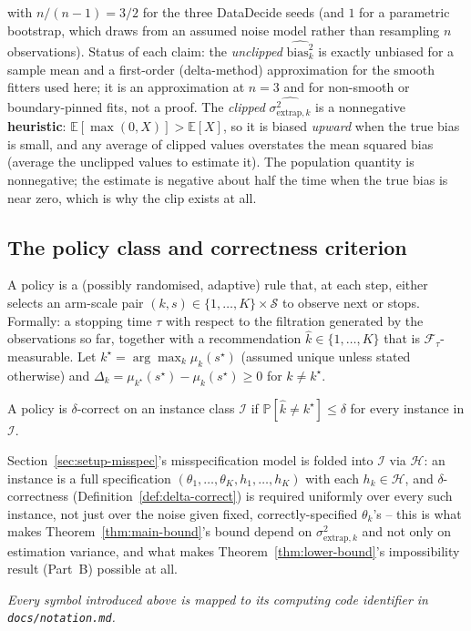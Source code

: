 \begin{remark}
\[\]
with $n/(n-1) = 3/2$ for the three DataDecide seeds (and $1$ for a parametric bootstrap,
which draws from an assumed noise model rather than resampling $n$ observations).
Status of each claim: the \emph{unclipped} $\widehat{\mathrm{bias}^2_k}$ is exactly
unbiased for a sample mean and a first-order (delta-method) approximation for the smooth
fitters used here; it is an approximation at $n = 3$ and for non-smooth or
boundary-pinned fits, not a proof. The \emph{clipped} $\widehat{\sigma^2_{\mathrm{extrap}, k}}$
is a nonnegative \textbf{heuristic}: $\mathbb{E}[\max(0, X)] > \mathbb{E}[X]$, so it is
biased \emph{upward} when the true bias is small, and any average of clipped values
overstates the mean squared bias (average the unclipped values to estimate it). The
population quantity is nonnegative; the estimate is negative about half the time when the
true bias is near zero, which is why the clip exists at all.
\end{remark}

\subsection{The policy class and correctness criterion}
\label{sec:setup-policy}

A policy is a (possibly randomised, adaptive) rule that, at each step, either selects
an arm-scale pair $(k, s) \in \{1, \dots, K\} \times \mathcal{S}$ to observe next or
stops. Formally: a stopping time $\tau$ with respect to the filtration generated by the
observations so far, together with a recommendation $\hat{k} \in \{1, \dots, K\}$ that
is $\mathcal{F}_\tau$-measurable. Let
$k^\star = \arg\max_k \mu_k(s^\star)$ (assumed unique unless stated otherwise) and
$\Delta_k = \mu_{k^\star}(s^\star) - \mu_k(s^\star) \ge 0$ for $k \ne k^\star$.

\begin{definition}
\label{def:delta-correct}
A policy is $\delta$-correct on an instance class $\mathcal{I}$ if
$\mathbb{P}[\hat{k} \ne k^\star] \le \delta$ for every instance in $\mathcal{I}$.
\end{definition}

Section~\ref{sec:setup-misspec}'s misspecification model is folded into
$\mathcal{I}$ via $\mathcal{H}$: an instance is a full specification
$(\theta_1, \dots, \theta_K, h_1, \dots, h_K)$ with each $h_k \in \mathcal{H}$, and
$\delta$-correctness (Definition~\ref{def:delta-correct}) is required uniformly over
every such instance, not just over the noise given fixed, correctly-specified
$\theta_k$'s -- this is what makes Theorem~\ref{thm:main-bound}'s bound depend on
$\sigma^2_{\mathrm{extrap}, k}$ and not only on estimation variance, and what makes
Theorem~\ref{thm:lower-bound}'s impossibility result (Part~B) possible at all.

\bigskip
\noindent\emph{Every symbol introduced above is mapped to its computing code identifier
in \texttt{docs/notation.md}.}
